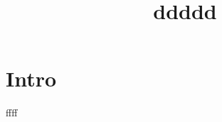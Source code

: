 \documentclass[paper=a4, fontsize=11pt, twosided]{article}  %
\title{ ddddd \vspace{-5em}}
\date{}
\numberwithin{equation}{section}        %
\numberwithin{figure}{section}          %
\numberwithin{table}{section}               %
\theoremstyle{definition}
\theoremstyle{plain}
\begin{document}
\maketitle

\begin{abstract}

\end{abstract}

\section{Intro}
ffff



\clearpage
\newpage
% 
% 

% 
\end{document}
